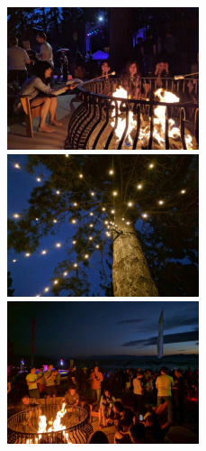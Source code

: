 \documentclass[10pt,twocolumn,letterpaper]{article}
\newcommand{\threewidth}{2.22in}
\begin{document}
\begin{figure}[!]
\centering
  \includegraphics[width=\threewidth]{figures/images/IMG_20160829_200131.jpg}
  \includegraphics[width=\threewidth]{figures/images/IMG_20160829_200538.jpg}
  \includegraphics[width=\threewidth]{figures/images/IMG_20160829_200807.jpg}

\end{figure}
\end{document}
